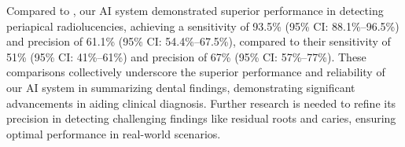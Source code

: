 Compared to \citet{endres2020development}, our AI system demonstrated superior performance in detecting periapical radiolucencies, achieving a sensitivity of 93.5\% (95\% CI: 88.1\%--96.5\%) and precision of 61.1\% (95\% CI: 54.4\%--67.5\%), compared to their sensitivity of 51\% (95\% CI: 41\%--61\%) and precision of 67\% (95\% CI: 57\%--77\%).
These comparisons collectively underscore the superior performance and reliability of our AI system in summarizing dental findings, demonstrating significant advancements in aiding clinical diagnosis.
Further research is needed to refine its precision in detecting challenging findings like residual roots and caries, ensuring optimal performance in real-world scenarios.
\fi